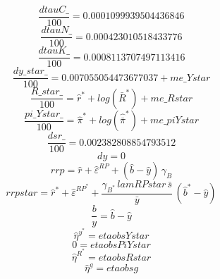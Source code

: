 \begin{dmath}
\frac{{dtauC\_}}{100}=0.0001099939504436846
\end{dmath}
\begin{dmath}
\frac{{dtauN\_}}{100}=0.000423010518433776
\end{dmath}
\begin{dmath}
\frac{{dtauK\_}}{100}=0.0008113707497113416
\end{dmath}
\begin{dmath}
\frac{{dy\_star\_}}{100}=0.007055054473677037+{me\_Ystar}
\end{dmath}
\begin{dmath}
\frac{{R\_star\_}}{100}={\hat{r}^*}+log\left({\bar{R}^*}\right)+{me\_Rstar}
\end{dmath}
\begin{dmath}
\frac{{pi\_Ystar\_}}{100}={\hat{\pi}^*}+log\left({\hat{\bar{\pi}}^*}\right)+{me\_piYstar}
\end{dmath}
\begin{dmath}
\frac{{dsr\_}}{100}=0.002382808854793512
\end{dmath}
\begin{dmath}
{dy}=0
\end{dmath}
\begin{dmath}
{rrp}={\hat{r}}+{\hat{\varepsilon}^{RP}}+\left({\hat{b}}-{\hat{y}}\right)\, {\gamma_{B}}
\end{dmath}
\begin{dmath}
{rrpstar}={\hat{r}^*}+{\hat{\varepsilon}^{RP^*}}+\frac{{\gamma_{B^*}}\, {lamRPstar}\, {\bar{s}}}{{\bar{y}}}\, \left({\hat{b}^*}-{\hat{y}}\right)
\end{dmath}
\begin{dmath}
{\frac{b}{y}}={\hat{b}}-{\hat{y}}
\end{dmath}
\begin{dmath}
{\hat{\eta}^{y^*}}={etaobsYstar}
\end{dmath}
\begin{dmath}
0={etaobsPiYstar}
\end{dmath}
\begin{dmath}
{\hat{\eta}^{R^*}}={etaobsRstar}
\end{dmath}
\begin{dmath}
{\hat{\eta}^{g}}={etaobsg}
\end{dmath}
